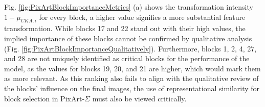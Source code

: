 Fig. \ref{fig:PixArtBlockImportanceMetrics} (a) shows the transformation intensity $1-\mu_{CKA,i}$ for every block, a higher value signifies a more substantial feature transformation. While blocks 17 and 22 stand out with their high values, the implied importance of these blocks cannot be confirmed by qualitative analysis (Fig. \ref{fig:PixArtBlockImportanceQualitatively}). Furthermore, blocks 1, 2, 4, 27, and 28 are not uniquely identified as critical blocks for the performance of the model, as the values for blocks 19, 20, and 21 are higher, which would mark them as more relevant. As this ranking also fails to align with the qualitative review of the blocks' influence on the final images, the use of representational similarity for block selection in PixArt-$\Sigma$ must also be viewed critically.

%
%
%

